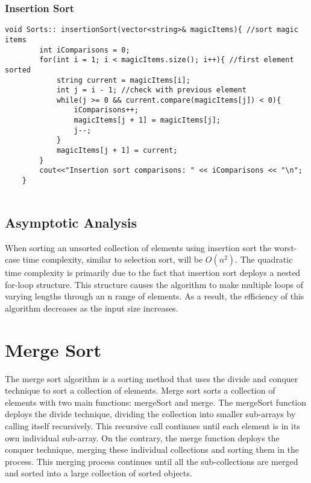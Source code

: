 \documentclass[letterpaper, 10pt,DIV=13]{scrartcl}
\numberwithin{equation}{section} %
\numberwithin{figure}{section} %
\numberwithin{table}{section} %
\begin{document}
\subsubsection*{Insertion Sort}
    \lstset{numbers=left, numberstyle=\tiny, stepnumber=1, numbersep=5pt, basicstyle=\footnotesize\ttfamily}
    \begin{lstlisting}[frame=single, ]
    void Sorts:: insertionSort(vector<string>& magicItems){ //sort magic items
        int iComparisons = 0;
        for(int i = 1; i < magicItems.size(); i++){ //first element sorted
            string current = magicItems[i];
            int j = i - 1; //check with previous element
            while(j >= 0 && current.compare(magicItems[j]) < 0){
                iComparisons++;
                magicItems[j + 1] = magicItems[j];
                j--;
            }
            magicItems[j + 1] = current;
        }
        cout<<"Insertion sort comparisons: " << iComparisons << "\n";
    }
    
\end{lstlisting}

\subsection{Asymptotic Analysis}
When sorting an unsorted collection of elements using insertion sort the worst-case time complexity, similar to selection sort, will be $O(n^2)$. The quadratic time complexity is primarily due to the fact that insertion sort deploys a nested for-loop structure. This structure causes the algorithm to make multiple loops of varying lengths through an n range of elements. As a result, the efficiency of this algorithm decreases as the input size increases.

\pagebreak

\section{Merge Sort}
The merge sort algorithm is a sorting method that uses the divide and conquer technique to sort a collection of elements. Merge sort sorts a collection of elements with two main functions: mergeSort and merge. The mergeSort function deploys the divide technique, dividing the collection into smaller sub-arrays by calling itself recursively. This recursive call continues until each element is in its own individual sub-array. On the contrary, the merge function deploys the conquer technique, merging these individual collections and sorting them in the process. This merging process continues until all the sub-collections are merged and sorted into a large collection of sorted objects.
\end{document}
